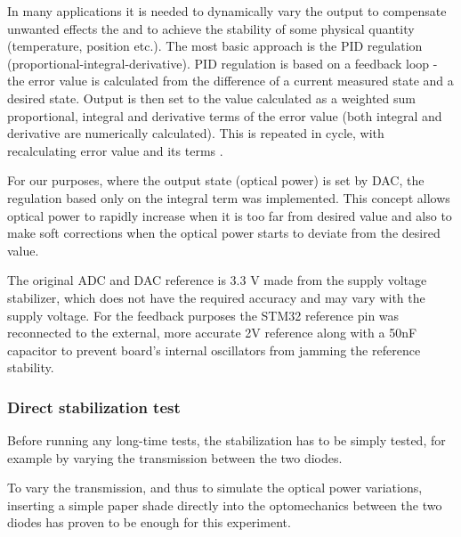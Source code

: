 \par
In many applications it is needed to dynamically vary the output to compensate unwanted effects the and to achieve the stability of some physical quantity (temperature, position etc.). The most basic approach is the PID regulation (proportional-integral-derivative). PID regulation is based on a feedback loop - the error value is calculated from the difference of a current measured state and a desired state. Output is then set to the value calculated as a weighted sum proportional, integral and derivative terms of the error value (both integral and derivative are numerically calculated). This is repeated in cycle, with recalculating error value and its terms \cite{PID}.

\par
For our purposes, where the output state (optical power) is set by DAC, the regulation based only on the integral term was implemented. This concept allows optical power to rapidly increase when it is too far from desired value and also to make soft corrections when the optical power starts to deviate from the desired value. 

\par

The original ADC and DAC reference is 3.3 V made from the supply voltage stabilizer, which does not have the required accuracy and may vary with the supply voltage. For the feedback purposes the STM32 reference pin was reconnected to the external, more accurate 2V reference along with a 50nF capacitor to prevent board's internal oscillators from jamming the reference stability.     




\subsubsection{Direct stabilization test}

Before running any long-time tests, the stabilization has to be simply tested, for example by varying the transmission between the two diodes.
\par
To vary the transmission, and thus to simulate the optical power variations, inserting a simple paper shade directly into the optomechanics between the two diodes has proven to be enough for this experiment.

